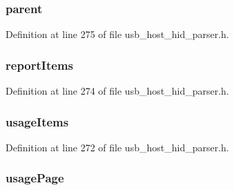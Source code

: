 \subsubsection[{parent}]{ parent}\label{struct___h_i_d___c_o_l_l_e_c_t_i_o_n_a00ebc533f337e8fb72c2f4261566bca2}


Definition at line 275 of file usb\+\_\+host\+\_\+hid\+\_\+parser.\+h.

\hypertarget{struct___h_i_d___c_o_l_l_e_c_t_i_o_n_a0540b939f53782aefe3dcf1f653ab13f}{}
\subsubsection[{report\+Items}]{ report\+Items}\label{struct___h_i_d___c_o_l_l_e_c_t_i_o_n_a0540b939f53782aefe3dcf1f653ab13f}


Definition at line 274 of file usb\+\_\+host\+\_\+hid\+\_\+parser.\+h.

\hypertarget{struct___h_i_d___c_o_l_l_e_c_t_i_o_n_ae443eb226a165cd8e906d6135bf3c0e8}{}
\subsubsection[{usage\+Items}]{ usage\+Items}\label{struct___h_i_d___c_o_l_l_e_c_t_i_o_n_ae443eb226a165cd8e906d6135bf3c0e8}


Definition at line 272 of file usb\+\_\+host\+\_\+hid\+\_\+parser.\+h.

\hypertarget{struct___h_i_d___c_o_l_l_e_c_t_i_o_n_aa44ef18c8cbb507831398f1e85c62d0b}{}
\subsubsection[{usage\+Page}]{ usage\+Page}\label{struct___h_i_d___c_o_l_l_e_c_t_i_o_n_aa44ef18c8cbb507831398f1e85c62d0b}


